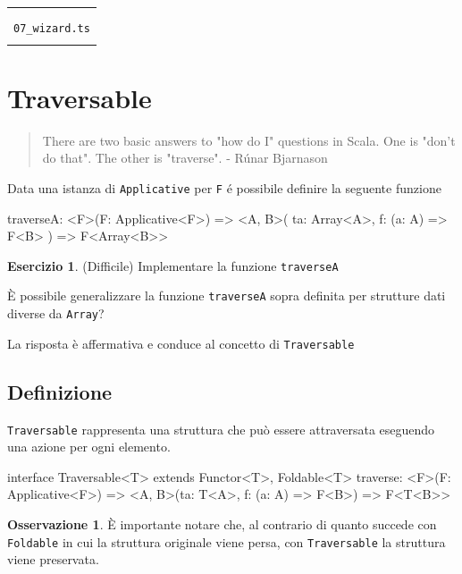 \documentclass[12pt]{article}
\theoremstyle{definition}
\newtheorem{exercise}{Esercizio}[section]
\newtheorem{observation}{Osservazione}[section]
\newenvironment{demo}
    {\begin{center}
    \begin{tabular}{|p{0.9\textwidth}|}
    \hline\\
    }
    {
    \\\\\hline
    \end{tabular}
    \end{center}
    }
\newenvironment{code}
  {\vspace{0.5cm} \VerbatimEnvironment\begin{typescriptcode}}
  {\end{typescriptcode} \vspace{0.2cm}}
\begin{document}
\begin{demo}
\begin{center}
\textbf{DEMO}

\texttt{06\_BinaryTree.ts} \\
\texttt{07\_wizard.ts}
\end{center}
\end{demo}

\newpage

\section{Traversable}

\begin{quote}
There are two basic answers to "how do I" questions in Scala. One is "don't do that". The other is "traverse". - Rúnar Bjarnason
\end{quote}

Data una istanza di \texttt{Applicative} per \texttt{F} é possibile definire la seguente funzione

\begin{code}
traverseA: <F>(F: Applicative<F>) => <A, B>(
  ta: Array<A>,
  f: (a: A) => F<B>
) => F<Array<B>>
\end{code}

\begin{exercise}
(Difficile) Implementare la funzione \texttt{traverseA}
\end{exercise}

È possibile generalizzare la funzione \texttt{traverseA} sopra definita per strutture dati diverse da \texttt{Array}?

La risposta è affermativa e conduce al concetto di \texttt{Traversable}

\subsection{Definizione}

\texttt{Traversable} rappresenta una struttura che può essere attraversata eseguendo una azione per ogni elemento.

\begin{code}
interface Traversable<T> extends Functor<T>, Foldable<T> {
  traverse: <F>(F: Applicative<F>) =>
    <A, B>(ta: T<A>, f: (a: A) => F<B>) => F<T<B>>
}
\end{code}

\begin{observation}
È importante notare che, al contrario di quanto succede con \texttt{Foldable} in cui la struttura originale viene persa,
con \texttt{Traversable} la struttura viene preservata.
\end{observation}
\end{document}
